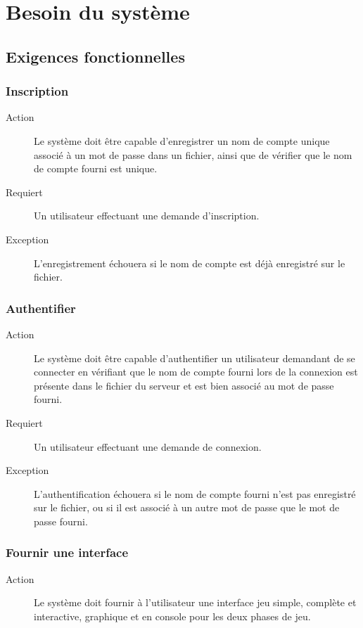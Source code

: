\documentclass[a4paper]{article}
\begin{document}
\section{Besoin du système}
\subsection{Exigences fonctionnelles}

\subsubsection{Inscription}
\begin{description}
\item[Action] Le système doit être capable d'enregistrer un nom de compte unique associé à un mot de passe dans un fichier, ainsi que de vérifier que le nom de compte fourni est unique.
\item[Requiert] Un \gls{utilisateur} effectuant une demande d'inscription.
\item[Exception] L'enregistrement échouera si le nom de compte est déjà enregistré sur le fichier.
\end{description}

\subsubsection{Authentifier}
\begin{description}
\item[Action] Le système doit être capable d'authentifier un \gls{utilisateur} demandant de se connecter en vérifiant que le nom de compte fourni lors de la connexion est présente dans le fichier du \gls{serveur} et est bien associé au mot de passe fourni.
\item[Requiert] Un \gls{utilisateur} effectuant une demande de connexion.
\item[Exception] L'authentification échouera si le nom de compte fourni n'est pas enregistré sur le fichier, ou si il est associé à un autre mot de passe que le mot de passe fourni.
\end{description}

\subsubsection{Fournir une interface}
\begin{description}
\item[Action] Le système doit fournir à l'\gls{utilisateur} une interface jeu simple, complète et interactive, graphique et en console pour les deux phases de jeu.
\end{description}
\end{document}
